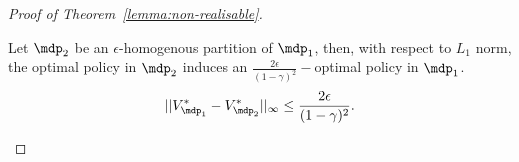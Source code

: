 \begin{proof}[Proof of Theorem~\ref{lemma:non-realisable}]
\begin{lemma}\label{lemma:opt_opt}
    Let $\mdp_2$ be an $\epsilon$-homogenous partition of $\mdp_1$, then, with respect to $L_1$ norm, the optimal policy in $\mdp_2$ induces an $\frac{2\epsilon}{(1-\gamma)^2}-$optimal policy in $\mdp_1$. 
    \begin{equation}
        ||V_{\mdp_1}^*-V_{\mdp_2}^*||_\infty \leq \frac{2\epsilon}{(1-\gamma)^2}.
    \end{equation}
\end{lemma}


\end{proof}
